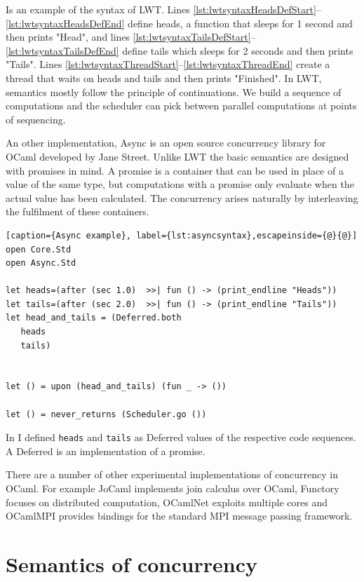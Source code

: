 \documentclass[12pt,twoside,notitlepage]{report}
\begin{document}
Is  an example of the syntax of LWT. Lines \ref{lst:lwtsyntaxHeadsDefStart}--\ref{lst:lwtsyntaxHeadsDefEnd} define heads, a function that sleeps for 1 second and then prints "Head", and lines \ref{lst:lwtsyntaxTailsDefStart}--\ref{lst:lwtsyntaxTailsDefEnd} define tails which sleeps for 2 seconds and then prints "Tails".  Lines \ref{lst:lwtsyntaxThreadStart}--\ref{lst:lwtsyntaxThreadEnd} create a thread that waits on heads and tails and then prints "Finished".  In LWT, semantics mostly follow the principle of continuations. We build a sequence of computations and the scheduler can pick between parallel computations at points of sequencing.

An other implementation, Async is an open source concurrency library for OCaml developed by Jane Street. Unlike LWT the basic semantics are designed with promises in mind. A promise is a container that can be used in place of a value of the same type, but computations with a promise only evaluate when the actual value has been calculated. The concurrency arises naturally by interleaving the fulfilment of these containers. 


\begin{minipage}{\linewidth}
\begin{lstlisting}[caption={Async example}, label={lst:asyncsyntax},escapeinside={@}{@}]
open Core.Std
open Async.Std

let heads=(after (sec 1.0)  >>| fun () -> (print_endline "Heads"))
let tails=(after (sec 2.0)  >>| fun () -> (print_endline "Tails"))
let head_and_tails = (Deferred.both
   heads
   tails)


let () = upon (head_and_tails) (fun _ -> ())
  
let () = never_returns (Scheduler.go ())
\end{lstlisting}
\end{minipage}



In  I defined \verb|heads| and \verb|tails| as Deferred values of the respective code sequences. A Deferred is an implementation of a promise.


There are a number of other experimental implementations of concurrency in OCaml. For example JoCaml\cite{jocaml} implements join calculus over OCaml, Functory\cite{functory} focuses on distributed computation, OCamlNet exploits multiple cores and OCamlMPI\cite{ocamlmpi} provides bindings for the standard MPI message passing framework.


\section{Semantics of concurrency}
\end{document}
